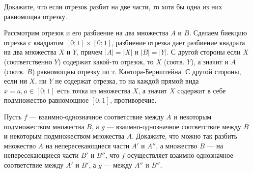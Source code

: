 \documentclass[a4paper,12pt,twoside]{article}
\begin{document}
\begin{?}
    Докажите, что если отрезок разбит на две части, то хотя бы одна из них равномощна отрезку.
\end{?}
\begin{solution}{}
    Рассмотрим отрезок и его разбиение на два множества \(A\) и \(B\). Сделаем биекцию отрезка с квадратом \([0; 1] \times [0; 1]\), разбиение отрезка дает разбиение квадрата на два множества \(X\) и \(Y\), причем \(|A| = |X|\) и \(|B| = |Y|\). С другой стороны если \(X\) (соответственно \(Y\)) содержит какой-то отрезок, то \(X\) (соотв. \(Y\)), а значит и \(A\) (соотв. \(B\)) равномощны отрезку по т. Кантора-Бернштейна. С другой стороны, если ни \(X\), ни \(Y\) не содержат отрезка, то на каждой прямой вида \(x = a, a \in [0; 1]\) есть точка из множества \(X\), а значит \(X\) содержит в себе подмножество равномощное \([0; 1]\), противоречие.
\end{solution}
\begin{?}
    Пусть \(f\) --- взаимно-однозначное соответствие между \(A\) и некоторым подмножеством множества \(B\), а \(g\) --- взаимно-однозначное соответствие между \(B\) и некоторым подмножеством множества \(A\). Докажите, что можно так разбить множество \(A\) на непересекающиеся части \(A'\) и \(A''\), а множество \(B\) --- на непересекающиеся части \(B'\) и \(B''\), что \(f\) осуществляет взаимно-однозначное соответствие между \(A'\) и \(B'\), а \(g\) --- между \(A''\) и \(B''\).
\end{?}
\end{document}
